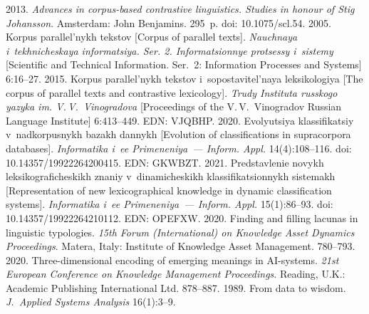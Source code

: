   \begin{multicols}{2}

\renewcommand{\bibname}{\protect\rmfamily References}

{\small\frenchspacing
 {%
 \begin{thebibliography}{99} 
 2013. \textit{Advances in corpus-based 
contrastive linguistics. Studies in honour of Stig Johansson}. Amsterdam: John 
Benjamins. 295~p. doi: 10.1075/scl.54.
 2005. Korpus 
parallel'nykh tekstov [Corpus of parallel texts]. \textit{Nauchnaya i~tekhnicheskaya 
informatsiya. Ser. 2. Informatsionnye protsessy i~sistemy} [Scientific and Technical 
Information. Ser.~2: Information Processes and Systems] 6:16--27.
 2015. Korpus parallel'nykh tekstov i~sopostavitel'naya 
leksikologiya [The corpus of parallel texts and contrastive lexicology]. \textit{Trudy 
Instituta russkogo yazyka im. V.\,V.~Vinogradova} [Proceedings of the 
V.\,V.~Vinogradov Russian Language Institute] 6:413--449. EDN: VJQBHP.
 2020. Evolyutsiya 
klassifikatsiy v~nadkorpusnykh ba\-zakh dannykh [Evolution of classifications in 
supracorpora databases]. \textit{Informatika i~ee Primeneniya~--- Inform. \mbox{Appl.}}  
14(4):108--116. doi: 10.14357/19922264200415.  
EDN: GKWBZT.
 2021. 
Predstavlenie novykh leksikograficheskikh znaniy v~dinamicheskikh 
klassifikatsionnykh sistemakh [Representation of new lexicographical knowledge in 
dynamic classification systems]. \textit{Informatika i~ee Primeneniya~--- Inform. 
Appl.} 15(1):86--93. doi: 10.14357/19922264210112. EDN: OPEFXW.
 2020. Finding and filling lacunas in linguistic typologies. 
\textit{15th Forum (International) on Knowledge Asset Dynamics Proceedings}. 
Matera, Italy: Institute of Knowledge Asset Management. 780--793.
 2020. Three-dimensional encoding of emerging meanings in  
AI-systems. \textit{21st European Conference on Knowledge Management 
Proceedings}. Reading, U.K.: Academic Publishing International Ltd. 878--887.
 1989. From data to wisdom. \textit{J.~Applied Systems Analysis} 
16(1):3--9.

\end{thebibliography}}}
\end{multicols}
